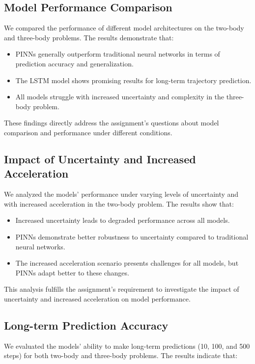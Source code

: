 \documentclass[12pt,a4paper]{article}
\begin{document}
\subsection{Model Performance Comparison}
We compared the performance of different model architectures on the two-body and three-body problems. The results demonstrate that:

\begin{itemize}
    \item PINNs generally outperform traditional neural networks in terms of prediction accuracy and generalization.
    \item The LSTM model shows promising results for long-term trajectory prediction.
    \item All models struggle with increased uncertainty and complexity in the three-body problem.
\end{itemize}

These findings directly address the assignment's questions about model comparison and performance under different conditions.

\subsection{Impact of Uncertainty and Increased Acceleration}
We analyzed the models' performance under varying levels of uncertainty and with increased acceleration in the two-body problem. The results show that:

\begin{itemize}
    \item Increased uncertainty leads to degraded performance across all models.
    \item PINNs demonstrate better robustness to uncertainty compared to traditional neural networks.
    \item The increased acceleration scenario presents challenges for all models, but PINNs adapt better to these changes.
\end{itemize}

This analysis fulfills the assignment's requirement to investigate the impact of uncertainty and increased acceleration on model performance.

\subsection{Long-term Prediction Accuracy}
We evaluated the models' ability to make long-term predictions (10, 100, and 500 steps) for both two-body and three-body problems. The results indicate that:
\end{document}
